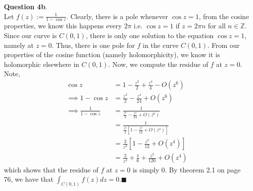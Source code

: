 \documentclass{article}
\begin{document}
    \textbf{Question 4b}.\\
    Let $f(z) := \frac{1}{1-\cos{z}}$. Clearly, there is a pole whenever $\cos{z} = 1$, from the cosine properties, we know this happens
    every $2\pi$ i.e. $\cos{z} = 1$ if $z = 2\pi n$ for all $n\in\mathbb{Z}$. Since our curve is $C(0,1)$, there is only one solution
    to the equation $\cos{z} = 1$, namely at $z = 0$. Thus, there is one pole for $f$ in the curve $C(0,1)$. From our properties of
    the cosine function (namely holomorphicity), we know it is holomorphic elsewhere in $C(0,1)$. Now, we compute the residue of $f$
    at $z = 0$. Note,
    \begin{align*}
        \cos{z} &= 1 - \frac{z^2}{2} + \frac{z^4}{4} - O(z^6) \\
        \implies 1 - \cos{z} &= \frac{z^2}{2} - \frac{z^4}{24} + O(z^6) \\
        \implies \frac{1}{1-\cos{z}} &= \frac{1}{\frac{z^2}{2} - \frac{z^4}{24} + O(z^6)}\\
        &= \frac{1}{\frac{z^2}{2}[1 - \frac{z^2}{12} + O(z^4)]} \\
        &= \frac{2}{z^2}[1 - \frac{z^2}{12} + O(z^4)] \\
        &= \frac{2}{z^2} + \frac{1}{6} + \frac{z^2}{120} + O(z^4)
    \end{align*}
    which shows that the residue of $f$ at $z = 0$ is simply 0. By theorem 2.1 on page 76, we have that $\int_{C(0,1)} f(z)dz = 
    0$.\hfill$\blacksquare$\\
\end{document}
